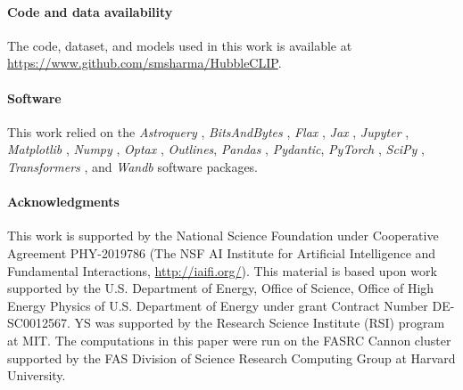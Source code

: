 \documentclass[10pt]{article} %
\newcommand{\package}[1]{\textsl{#1}\xspace}
\begin{document}


\paragraph*{Code and data availability}

The code, dataset, and models used in this work is available at \url{https://www.github.com/smsharma/HubbleCLIP}.

\paragraph*{Software}

This work relied on the \package{Astroquery} \citep{2019AJ....157...98G}, \package{BitsAndBytes} \citep{dettmers2022llmint8}, \package{Flax} \citep{flax2020github}, \package{Jax} \citep{jax2018github}, \package{Jupyter} \citep{Kluyver2016jupyter}, \package{Matplotlib} \citep{Hunter:2007}, \package{Numpy} \citep{harris2020array}, \package{Optax} \citep{deepmind2020jax}, \package{Outlines}, \package{Pandas} \citep{2020SciPy-NMeth}, \package{Pydantic}, \package{PyTorch} \citep{paszke2019pytorch}, \package{SciPy} \citep{2020SciPy-NMeth}, \package{Transformers} \citep{wolf2019huggingface}, and \package{Wandb} \citep{wandb} software packages.



\paragraph*{Acknowledgments}

This work is supported by the National Science Foundation under Cooperative Agreement PHY-2019786 (The NSF AI Institute for Artificial Intelligence and Fundamental Interactions, \url{http://iaifi.org/}). This material is based upon work supported by the U.S. Department of Energy, Office of Science, Office of High Energy Physics of U.S. Department of Energy under grant Contract Number  DE-SC0012567. YS was supported by the Research Science Institute (RSI) program at MIT. The computations in this paper were run on the FASRC Cannon cluster supported by the FAS Division of Science Research Computing Group at Harvard University.
\end{document}
